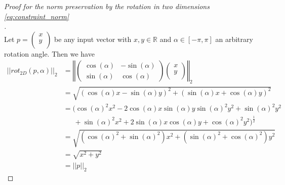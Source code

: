 \begin{proof}[Proof for the norm preservation by the rotation in two dimensions \eqref{eq:constraint_norm}\\]$\,$\\
	Let $p = \begin{pmatrix}x \\y \\\end{pmatrix}$ be any input vector with $x, y \in \mathbb{R}$ and $\alpha \in [-\pi, \pi]$ an arbitrary rotation angle. Then we have
	\begin{equation}
	\label{proof:norm_preservation}
	\begin{aligned}
	||rot_{2D}(p, \alpha)||_2 &= \left\Vert \begin{pmatrix} \cos(\alpha) & -\sin(\alpha) \\\sin(\alpha) & \cos(\alpha) \end{pmatrix} \begin{pmatrix}x \\y \\\end{pmatrix} \right\Vert_2 \\
	&= \sqrt{(\cos(\alpha)x - \sin(\alpha)y)^2 + (\sin(\alpha)x + \cos(\alpha)y)^2}\\
	&= (\cos(\alpha)^2x^2 -2\cos(\alpha)x\sin(\alpha)y \sin(\alpha)^2y^2 + \sin(\alpha)^2y^2\\ &\,\,\,\,\,\,\,\,\,+ \sin(\alpha)^2x^2 + 2\sin(\alpha)x\cos(\alpha)y + \cos(\alpha)^2y^2)^\frac{1}{2}\\
	&= \sqrt{(\cos(\alpha)^2 + \sin(\alpha)^2)x^2 + (\sin(\alpha)^2 + \cos(\alpha)^2)y^2}\\
	&= \sqrt{x^2 + y^2}\\
	&= ||p||_2
	\end{aligned}
	\end{equation}
\end{proof}

